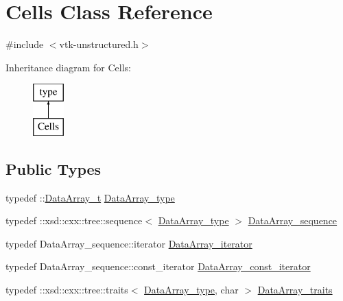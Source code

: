 \hypertarget{classCells}{}\section{Cells Class Reference}
\label{classCells}


{\ttfamily \#include $<$vtk-\/unstructured.\+h$>$}

Inheritance diagram for Cells\+:\begin{figure}[H]
\begin{center}
\leavevmode
\includegraphics[height=2.000000cm]{classCells}
\end{center}
\end{figure}
\subsection*{Public Types}
\begin{DoxyCompactItemize}
\item 
typedef \+::\hyperlink{classDataArray__t}{Data\+Array\+\_\+t} \hyperlink{classCells_ad69e76337c22596e70b27d93c54dd722}{Data\+Array\+\_\+type}
\item 
typedef \+::xsd\+::cxx\+::tree\+::sequence$<$ \hyperlink{classCells_ad69e76337c22596e70b27d93c54dd722}{Data\+Array\+\_\+type} $>$ \hyperlink{classCells_ae2856ec1cc2c6d6a2ccac9de9a22c7b7}{Data\+Array\+\_\+sequence}
\item 
typedef Data\+Array\+\_\+sequence\+::iterator \hyperlink{classCells_a1873efdee2bb668676d01a7a5010faa2}{Data\+Array\+\_\+iterator}
\item 
typedef Data\+Array\+\_\+sequence\+::const\+\_\+iterator \hyperlink{classCells_ad01c81703074599471cd6159cdea1ac1}{Data\+Array\+\_\+const\+\_\+iterator}
\item 
typedef \+::xsd\+::cxx\+::tree\+::traits$<$ \hyperlink{classCells_ad69e76337c22596e70b27d93c54dd722}{Data\+Array\+\_\+type}, char $>$ \hyperlink{classCells_ac35ecebe10914f3d35e85589e998462b}{Data\+Array\+\_\+traits}
\end{DoxyCompactItemize}
